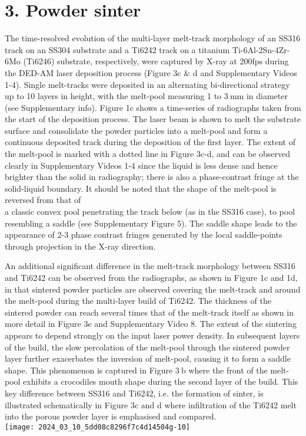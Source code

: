 \documentclass[10pt]{article}
\begin{document}
\section*{3. Powder sinter}
The time-resolved evolution of the multi-layer melt-track morphology of an SS316 track on an SS304 substrate and a Ti6242 track on a titanium Ti-6Al-2Sn-4Zr-6Mo (Ti6246) substrate, respectively, were captured by X-ray at $200 \mathrm{fps}$ during the DED-AM laser deposition process (Figure 3c \& d and Supplementary Videos 1-4). Single melt-tracks were deposited in an alternating bi-directional strategy up to 10 layers in height, with the melt-pool measuring 1 to $3 \mathrm{~mm}$ in diameter (see Supplementary info). Figure 1c shows a time-series of radiographs taken from the start of the deposition process. The laser beam is shown to melt the substrate surface and consolidate the powder particles into a melt-pool and form a continuous deposited track during the deposition of the first layer. The extent of the melt-pool is marked with a dotted line in Figure 3c-d, and can be observed clearly in Supplementary Videos 1-4 since the liquid is less dense and hence brighter than the solid in radiography; there is also a phase-contrast fringe at the solid-liquid boundary. It should be noted that the shape of the melt-pool is reversed from that of\\
a classic convex pool penetrating the track below (as in the SS316 case), to pool resembling a saddle (see Supplementary Figure 5). The saddle shape leads to the appearance of 2-3 phase contrast fringes generated by the local saddle-points through projection in the X-ray direction.

An additional significant difference in the melt-track morphology between SS316 and Ti6242 can be observed from the radiographs, as shown in Figure 1c and 1d, in that sintered powder particles are observed covering the melt-track and around the melt-pool during the multi-layer build of Ti6242. The thickness of the sintered powder can reach several times that of the melt-track itself as shown in more detail in Figure 3e and Supplementary Video 8. The extent of the sintering appears to depend strongly on the input laser power density. In subsequent layers of the build, the slow percolation of the melt-pool through the sintered powder layer further exacerbates the inversion of melt-pool, causing it to form a saddle shape. This phenomenon is captured in Figure $3 \mathrm{~b}$ where the front of the melt-pool exhibits a crocodiles mouth shape during the second layer of the build. This key difference between SS316 and Ti6242, i.e. the formation of sinter, is illustrated schematically in Figure 3c and d where infiltration of the Ti6242 melt into the porous powder layer is emphasised and compared.\\
\texttt{[image: 2024\_03\_10\_5dd08c8296f7c4d14504g-10]}
\end{document}
